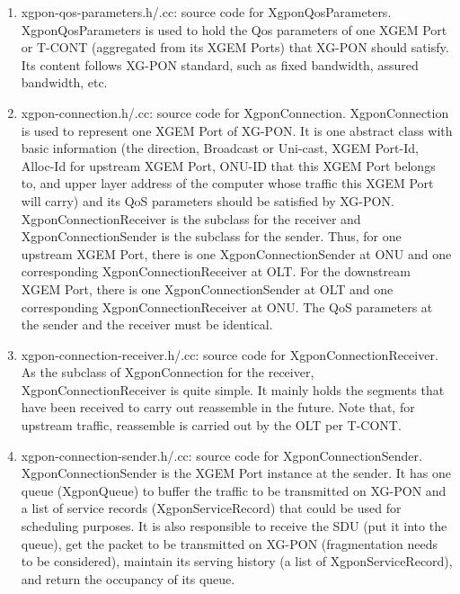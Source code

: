 \begin{enumerate}
\vspace{0.3in}



 \item xgpon-qos-parameters.h/.cc: source code for {\color{red} XgponQosParameters}. XgponQosParameters is used to 
hold the Qos parameters of one XGEM Port or T-CONT (aggregated from its XGEM Ports) that XG-PON should satisfy. 
Its content follows XG-PON standard, such as fixed bandwidth, assured bandwidth, etc.

 \item xgpon-connection.h/.cc: source code for {\color{red} XgponConnection}. XgponConnection is used to represent 
one XGEM Port of XG-PON. It is one abstract class with basic information (the direction, Broadcast or Uni-cast, 
XGEM Port-Id, Alloc-Id for upstream XGEM Port, ONU-ID that this XGEM Port belongs to, and upper layer address of 
the computer whose traffic this XGEM Port will carry) and its QoS parameters should be satisfied by XG-PON. 
XgponConnectionReceiver is the subclass for the receiver and XgponConnectionSender is the subclass for the sender. 
Thus, for one upstream XGEM Port, there is one XgponConnectionSender at ONU and one corresponding XgponConnectionReceiver 
at OLT. For the downstream XGEM Port, there is one XgponConnectionSender at OLT and one corresponding XgponConnectionReceiver 
at ONU. The QoS parameters at the sender and the receiver must be identical.

 \item xgpon-connection-receiver.h/.cc: source code for {\color{red} XgponConnectionReceiver}. As the subclass of XgponConnection 
for the receiver, XgponConnectionReceiver is quite simple. It mainly holds the segments that have been received to carry out 
reassemble in the future. Note that, for upstream traffic, reassemble is carried out by the OLT per T-CONT.

 \item xgpon-connection-sender.h/.cc: source code for {\color{red} XgponConnectionSender}. XgponConnectionSender 
is the XGEM Port instance at the sender. It has one queue (XgponQueue) to buffer the traffic to be transmitted 
on XG-PON and a list of service records (XgponServiceRecord) that could be used for scheduling purposes. 
It is also responsible to receive the SDU (put it into the queue), get the packet to be transmitted on XG-PON 
(fragmentation needs to be considered), maintain its serving history (a list of XgponServiceRecord), 
and return the occupancy of its queue.


\end{enumerate}
